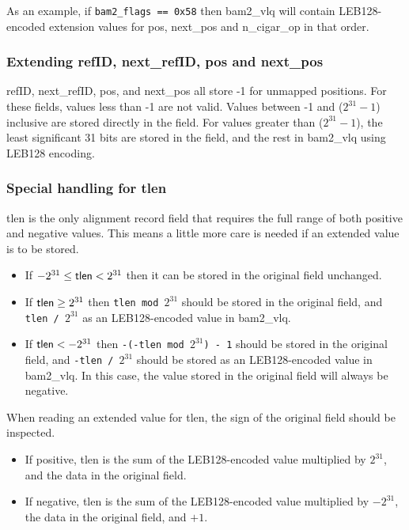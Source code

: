 \documentclass[10pt]{article}
\begin{document}
As an example, if {\tt bam2\_flags == 0x58} then {\sf bam2\_vlq} will
contain LEB128-encoded extension values for {\sf pos}, {\sf next\_pos} and
{\sf n\_cigar\_op} in that order.

\subsubsection{Extending {\sf refID}, {\sf next\_refID}, {\sf pos} and {\sf next\_pos}}\label{sec:v2-refid-pos}

{\sf refID}, {\sf next\_refID}, {\sf pos}, and {\sf next\_pos} all store
-1 for unmapped positions.
For these fields, values less than -1 are not valid.
Values between -1 and ($2^{31} - 1$) inclusive are stored directly in the field.
For values greater than ($2^{31} - 1$), the least significant 31 bits are stored
in the field, and the rest in {\sf bam2\_vlq} using LEB128 encoding.

\subsubsection{Special handling for {\sf tlen}}\label{sec:v2-tlen}

{\sf tlen} is the only alignment record field that requires the full range of
both positive and negative values.
This means a little more care is needed if an extended value is to be stored.
\begin{itemize}
\item If $-2^{31} \leq {\sf tlen} < 2^{31}$ then it can be stored in the original
field unchanged.
\item If ${\sf tlen} \geq 2^{31}$ then {\tt tlen mod $2^{31}$} should be stored in
the original field, and {\tt tlen / $2^{31}$} as an LEB128-encoded value in
{\sf bam2\_vlq}.
\item If ${\sf tlen} < -2^{31}$ then {\tt -(-tlen mod $2^{31}$) - 1} should be
stored in the original field, and {\tt -tlen / $2^{31}$} should be stored as an
LEB128-encoded value in {\sf bam2\_vlq}.  In this case, the value stored in the original field will always be negative.
\end{itemize}

When reading an extended value for {\sf tlen}, the sign of the original field
should be inspected.
\begin{itemize}
\item If positive, {\sf tlen} is the sum of the LEB128-encoded value multiplied
by $2^{31}$, and the data in the original field.
\item If negative, {\sf tlen} is the sum of the LEB128-encoded value multiplied
by $-2^{31}$, the data in the original field, and $+1$.
\end{itemize}
\end{document}
